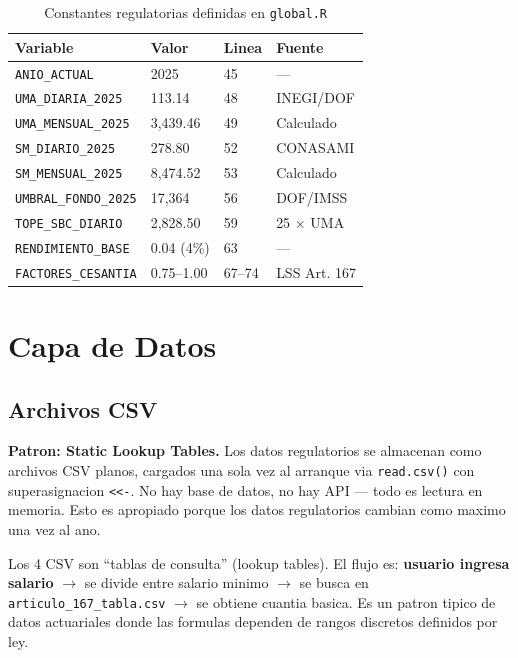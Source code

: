\documentclass[11pt, letterpaper, twoside]{report}
\begin{document}
\begin{table}[h]
\centering
\caption{Constantes regulatorias definidas en \texttt{global.R}}
\label{tab:constantes}
\begin{tabular}{llll}
\toprule
\textbf{Variable} & \textbf{Valor} & \textbf{Linea} & \textbf{Fuente} \\
\midrule
\texttt{ANIO\_ACTUAL} & 2025 & 45 & --- \\
\texttt{UMA\_DIARIA\_2025} & 113.14 & 48 & INEGI/DOF \\
\texttt{UMA\_MENSUAL\_2025} & 3,439.46 & 49 & Calculado \\
\texttt{SM\_DIARIO\_2025} & 278.80 & 52 & CONASAMI \\
\texttt{SM\_MENSUAL\_2025} & 8,474.52 & 53 & Calculado \\
\texttt{UMBRAL\_FONDO\_2025} & 17,364 & 56 & DOF/IMSS \\
\texttt{TOPE\_SBC\_DIARIO} & 2,828.50 & 59 & 25 $\times$ UMA \\
\texttt{RENDIMIENTO\_BASE} & 0.04 (4\%) & 63 & --- \\
\texttt{FACTORES\_CESANTIA} & 0.75--1.00 & 67--74 & LSS Art. 167 \\
\bottomrule
\end{tabular}
\end{table}


\chapter{Capa de Datos}
\label{ch:datos}

\section{Archivos CSV}
\label{sec:csv}

\begin{patronbox}
\textbf{Patron: Static Lookup Tables.} Los datos regulatorios se almacenan como
archivos CSV planos, cargados una sola vez al arranque via \texttt{read.csv()} con
superasignacion \texttt{<<-}. No hay base de datos, no hay API --- todo es
lectura en memoria. Esto es apropiado porque los datos regulatorios cambian
como maximo una vez al ano.
\end{patronbox}

\begin{intuicionbox}
Los 4 CSV son ``tablas de consulta'' (lookup tables). El flujo es:
\textbf{usuario ingresa salario} $\rightarrow$ se divide entre salario minimo
$\rightarrow$ se busca en \texttt{articulo\_167\_tabla.csv} $\rightarrow$ se obtiene
cuantia basica. Es un patron tipico de datos actuariales donde las formulas
dependen de rangos discretos definidos por ley.
\end{intuicionbox}
\end{document}
